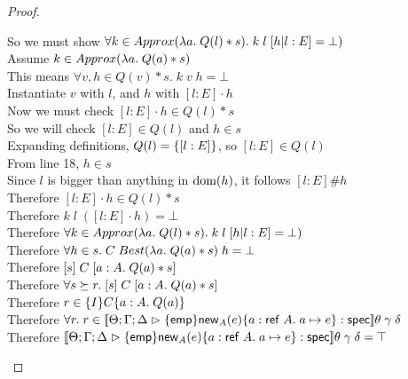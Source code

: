 \begin{proof}
\begin{tabbedproof}
    \oooooo So we must show $\forall k \in Approx(\lambda a.\;Q(l)*s).\;k\;l\;[h|l:E] = \bot)$ \\
    \oooooo Assume $k \in Approx(\lambda a.\;Q(a)*s)$ \\
    \ooooooo This means $\forall v, h \in Q(v)*s.\; k\;v\;h = \bot$ \\
    \ooooooo Instantiate $v$ with $l$, and $h$ with $[l:E]\cdot h$ \\
    \ooooooo Now we must check $[l:E]\cdot h \in Q(l) * s$ \\
    \ooooooo So we will check $[l:E] \in Q(l)$ and $h \in s$ \\
    \ooooooo Expanding definitions, $Q(l) = \{{[l:E]}\}$, so $[l:E] \in Q(l)$ \\
    \ooooooo From line 18, $h \in s$ \\
    \ooooooo Since $l$ is bigger than anything in $\mbox{dom}({h})$, it follows $[l:E] \# h$ \\
    \ooooooo Therefore $[l:E]\cdot h \in Q(l) * s$ \\
    \ooooooo Therefore $k\;l\;([l:E]\cdot h) = \bot$ \\
    \oooooo Therefore $\forall k \in Approx(\lambda a.\;Q(l)*s).\;k\;l\;[h|l:E] = \bot)$ \\
    \ooooo Therefore $\forall h \in s.\; C\;Best(\lambda a.\;Q(a)*s)\;h = \bot$ \\
    \ooooo Therefore $[{s}]\;{C}\;[{a:A}.\;{Q(a)*s}]$ \\
    \oooo Therefore $\forall s \succeq r.\; [{s}]\;{C}\;[{a:A}.\;{Q(a)*s}]$ \\
    \oooo Therefore $r \in \{{I}\}{C}\{{a:A}.\;{Q(a)}\}$ \\
    \ooo Therefore $\forall r.\; r \in [\![{{\Theta; \Gamma; \Delta} \vartriangleright {\{{\mathsf{emp}}\}{\mathsf{new}_{A}(e)}\{{a:\mathsf{ref}\;A}.\;{a \mapsto e}\}} : \mathsf{spec}}]\!]\theta\;\gamma\;\delta$ \\
    \ooo Therefore $[\![{{\Theta; \Gamma; \Delta} \vartriangleright {\{{\mathsf{emp}}\}{\mathsf{new}_{A}(e)}\{{a:\mathsf{ref}\;A}.\;{a \mapsto e}\}} : \mathsf{spec}}]\!]\theta\;\gamma\;\delta = \top$ \\
  \end{tabbedproof}
\end{proof}

